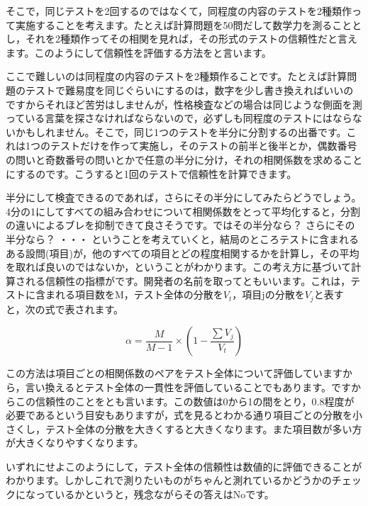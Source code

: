\documentclass{ltjbook}
\begin{document}
そこで，同じテストを2回するのではなくて，同程度の内容のテストを2種類作って実施することを考えます。たとえば計算問題を50問だして数学力を測ることとし，それを2種類作ってその相関を見れば，その形式のテストの信頼性だと言えます。このようにして信頼性を評価する方法をと言います。

ここで難しいのは同程度の内容のテストを2種類作ることです。たとえば計算問題のテストで難易度を同じぐらいにするのは，数字を少し書き換えればいいのですからそれほど苦労はしませんが，性格検査などの場合は同じような側面を測っている言葉を探さなければならないので，必ずしも同程度のテストにはならないかもしれません。そこで，同じ1つのテストを半分に分割するの出番です。これは1つのテストだけを作って実施し，そのテストの前半と後半とか，偶数番号の問いと奇数番号の問いとかで任意の半分に分け，それの相関係数を求めることにするのです。こうすると1回のテストで信頼性を計算できます。

半分にして検査できるのであれば，さらにその半分にしてみたらどうでしょう。4分の1にしてすべての組み合わせについて相関係数をとって平均化すると，分割の違いによるブレを抑制できて良さそうです。ではその半分なら？ さらにその半分なら？ ・・・
ということを考えていくと，結局のところテストに含まれるある設問(項目)が，他のすべての項目とどの程度相関するかを計算し，その平均を取れば良いのではないか，ということがわかります。この考え方に基づいて計算される信頼性の指標がです。開発者の名前を取ってともいいます。これは，テストに含まれる項目数をM，テスト全体の分散を$V_t$，項目jの分散を$V_j$と表すと，次の式で表されます。

\[  \alpha =   \frac{M}{M-1} \times \left(1-\frac{\sum V_j}{V_t} \right) \]

この方法は項目ごとの相関係数のペアをテスト全体について評価していますから，言い換えるとテスト全体の一貫性を評価していることでもあります。ですからこの信頼性のことをとも言います。この数値は0から1の間をとり，0.8程度が必要であるという目安もありますが，式を見るとわかる通り項目ごとの分散を小さくし，テスト全体の分散を大きくすると大きくなります。また項目数が多い方が大きくなりやすくなります。

いずれにせよこのようにして，テスト全体の信頼性は数値的に評価できることがわかります。しかしこれで測りたいものがちゃんと測れているかどうかのチェックになっているかというと，残念ながらその答えはNoです。
\end{document}
